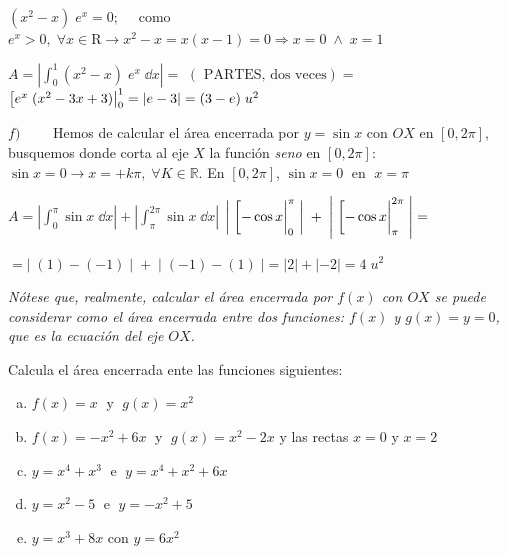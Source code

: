 \begin{proofw}
$(x^2-x)\; e^x=0; \quad$ como $e^x>0, \; \forall x \in \mathrm{R} \to x^2-x=x(x-1)=0 \Rightarrow x=0\; \wedge \; x=1 $

$A=\displaystyle \left| \int_0^1 (x^2-x)\; e^x \;\dd x  \right|=$
$(\text{ PARTES, dos veces})= $
$\eval[e^x\; (x^2-3x+3)|_0^1=|e-3| = (3-e)\; u^2$

\vspace{2mm}$f) \qquad$ Hemos de calcular el área encerrada por $y=\sin x$ con $OX$ en $[0,2\pi]$, busquemos donde corta al eje $X$ la función \emph{seno} en  $[0,2\pi]$:
$\sin x = 0 \to x=+k\pi, \; \forall K\in \mathbb R$. En $[0,2\pi]$, $\sin x =0\; $ en $\; x=\pi \; $ 

$A=\displaystyle  \left| \int_{0}^{\pi} \sin x \; \dd x \right| + \left| \int_{\pi}^{2\pi} \sin x \; \dd x \right| $
$\displaystyle \left| \; \eval[-\cos x|_{0}^{\pi} \; \right| \; +\;   \left| \; \eval[-\cos x|_{\pi}^{2\pi} \; \right| =$

$= |\; (1)-(-1)\; | \; +\; |\; (-1)-(1)\; | = |2|+|-2|=4\; u^2 $

\end{proofw}

\emph{Nótese que, realmente, calcular el área encerrada por $f(x)$ con $OX$ se puede considerar como el área encerrada entre dos funciones: $f(x)$ y $g(x)=y=0$, que es la ecuación del eje $OX$.}


\vspace{2mm}

\begin{ejre}
Calcula el área encerrada ente las funciones siguientes:

\begin{multicols}{2}
\begin{enumerate}[a) ]
\item $f(x)= x\; $ y $\; g(x)=x^2$
\item $f(x)=-x^2+6x\; $ y $\; g(x)=x^2-2x$ y las rectas $x=0$ y $x=2$
\item $y=x^4+x^3\; $ e $\; y=x^4+x^2+6x$
\item $y=x^2-5\;$ e $\; y=-x^2+5$
\item $y=x^3+8x$ con $y=6x^2$
\end{enumerate}	
\end{multicols}
\end{ejre}

